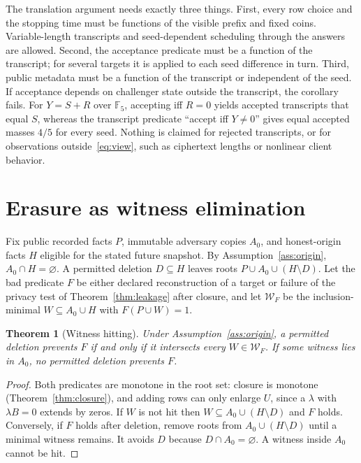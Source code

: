 \documentclass[pdflatex,sn-mathphys-num]{sn-jnl}
\theoremstyle{plain}
\newtheorem{theorem}{Theorem}
\theoremstyle{definition}
\newcommand{\F}{\mathbb{F}}
\begin{document}
The translation argument needs exactly three things. First, every row choice and the stopping time must be functions of the visible prefix and fixed coins. Variable-length transcripts and seed-dependent scheduling through the answers are allowed. Second, the acceptance predicate must be a function of the transcript; for several targets it is applied to each seed difference in turn. Third, public metadata must be a function of the transcript or independent of the seed. If acceptance depends on challenger state outside the transcript, the corollary fails. For $Y=S+R$ over $\F_5$, accepting iff $R=0$ yields accepted transcripts that equal $S$, whereas the transcript predicate ``accept iff $Y\neq0$'' gives equal accepted masses $4/5$ for every seed. Nothing is claimed for rejected transcripts, or for observations outside~\eqref{eq:view}, such as ciphertext lengths or nonlinear client behavior.


\section{Erasure as witness elimination}\label{sec:erasure}

Fix public recorded facts $P$, immutable adversary copies $A_0$, and honest-origin facts $H$ eligible for the stated future snapshot. By Assumption~\ref{ass:origin}, $A_0\cap H=\varnothing$. A permitted deletion $D\subseteq H$ leaves roots $P\cup A_0\cup(H\setminus D)$. Let the bad predicate $F$ be either declared reconstruction of a target or failure of the privacy test of Theorem~\ref{thm:leakage} after closure, and let $\mathcal W_F$ be the inclusion-minimal $W\subseteq A_0\cup H$ with $F(P\cup W)=1$.

\begin{theorem}[Witness hitting]\label{thm:cuts}
Under Assumption~\ref{ass:origin}, a permitted deletion prevents $F$ if and only if it intersects every $W\in\mathcal W_F$. If some witness lies in $A_0$, no permitted deletion prevents $F$.
\end{theorem}
\begin{proof}
Both predicates are monotone in the root set: closure is monotone (Theorem~\ref{thm:closure}), and adding rows can only enlarge $U$, since a $\lambda$ with $\lambda B=0$ extends by zeros. If $W$ is not hit then $W\subseteq A_0\cup(H\setminus D)$ and $F$ holds. Conversely, if $F$ holds after deletion, remove roots from $A_0\cup(H\setminus D)$ until a minimal witness remains. It avoids $D$ because $D\cap A_0=\varnothing$. A witness inside $A_0$ cannot be hit.
\end{proof}
\end{document}

